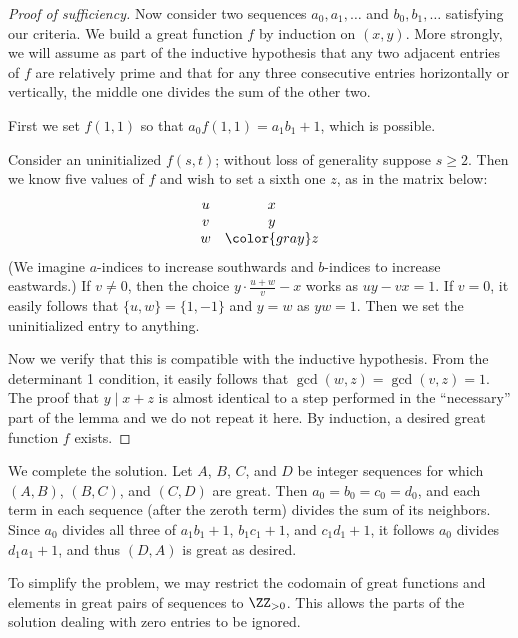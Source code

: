 \begin{proof}[Proof of sufficiency]
  Now consider two sequences $a_0, a_1, \dots$
  and $b_0, b_1, \dots$ satisfying our criteria.
  We build a great function $f$ by induction on $(x, y)$.
  More strongly, we will assume as part of the inductive hypothesis
  that any two adjacent entries of $f$ are relatively prime
  and that for any three consecutive entries horizontally or vertically,
  the middle one divides the sum of the other two.

  First we set $f(1, 1)$ so that $a_0 f(1, 1) = a_1 b_1 + 1$,
  which is possible.

  Consider an uninitialized $f(s, t)$;
  without loss of generality suppose $s \ge 2$.
  Then we know five values of $f$
  and wish to set a sixth one $z$,
  as in the matrix below:
  \[
    \begin{matrix}
    u & x\\
    v & y\\
    w & {\color{gray} z} \\
    \end{matrix}
  \]
  (We imagine $a$-indices to increase southwards and $b$-indices to increase eastwards.)
  If $v \neq 0$,
  then the choice $y \cdot \frac{u + w}{v} - x$ works
  as $uy - vx = 1$.
  If $v = 0$,
  it easily follows that $\{u, w\} = \{1, -1\}$
  and $y = w$ as $yw = 1$.
  Then we set the uninitialized entry to anything.

  Now we verify that this is compatible with the inductive hypothesis.
  From the determinant 1 condition,
  it easily follows that $\gcd(w, z) = \gcd(v, z) = 1$.
  The proof that $y \mid x + z$
  is almost identical to a step performed in the ``necessary'' part
  of the lemma and we do not repeat it here.
  By induction, a desired great function $f$ exists.
\end{proof}

We complete the solution.
Let $A$, $B$, $C$, and $D$ be integer sequences
for which $(A, B)$, $(B, C)$, and $(C, D)$ are great.
Then $a_0 = b_0 = c_0 = d_0$,
and each term in each sequence
(after the zeroth term)
divides the sum of its neighbors.
Since $a_0$ divides all three of $a_1b_1 + 1$, $b_1c_1 + 1$, and $c_1d_1 + 1$,
it follows $a_0$ divides $d_1a_1 + 1$,
and thus $(D, A)$ is great as desired.

\begin{remark*}
To simplify the problem,
we may restrict the codomain of great functions
and elements in great pairs of sequences
to $\ZZ_{> 0}$.
This allows the parts of the solution dealing with zero entries to be ignored.
\end{remark*}

